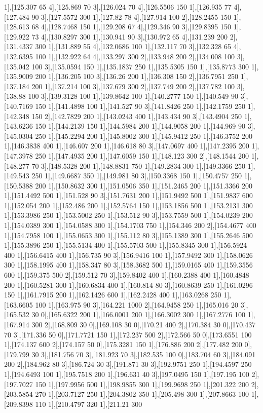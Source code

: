 {1],[125.307 65 4],[125.869 70 3],[126.024 70 4],[126.5506 150 1],[126.935 77 4],[127.484 90 3],[127.5572 300 1],[127.82 78 4],[127.914 100 2],[128.2455 150 1],[128.613 68 4],[128.7468 150 1],[129.208 67 4],[129.346 90 3],[129.8395 150 1],[129.922 73 4],[130.8297 300 1],[130.941 90 3],[130.972 65 4],[131.239 200 2],[131.4337 300 1],[131.889 55 4],[132.0686 100 1],[132.117 70 3],[132.328 65 4],[132.6395 100 1],[132.922 64 4],[133.297 300 2],[133.948 200 2],[134.008 100 3],[135.042 100 3],[135.0594 150 1],[135.1837 250 1],[135.5305 150 1],[135.8773 300 1],[135.9009 200 1],[136.205 100 3],[136.26 200 1],[136.308 150 2],[136.7951 250 1],[137.184 200 1],[137.214 100 3],[137.679 300 2],[137.749 200 2],[137.782 100 3],[138.88 100 3],[139.3128 100 1],[139.8642 100 1],[140.2777 150 1],[140.549 90 3],[140.7169 150 1],[141.4898 100 1],[141.527 90 3],[141.8426 250 1],[142.1759 250 1],[142.348 150 2],[142.7829 200 1],[143.0243 400 1],[143.434 90 3],[143.4904 250 1],[143.6236 150 1],[144.2139 150 1],[144.5984 200 1],[144.9058 200 1],[144.969 90 3],[145.0304 250 1],[145.2294 200 1],[145.8002 300 1],[145.9412 250 1],[146.3752 200 1],[146.3838 400 1],[146.607 200 1],[146.618 80 3],[147.0697 400 1],[147.2395 200 1],[147.3978 250 1],[147.4935 200 1],[147.6059 150 1],[148.123 300 2],[148.1544 200 1],[148.277 70 3],[148.5328 200 1],[148.8831 750 1],[149.2834 300 1],[149.3366 250 1],[149.543 250 1],[149.6687 350 1],[149.981 80 3],[150.3368 150 1],[150.4757 250 1],[150.5388 200 1],[150.8632 300 1],[151.0506 350 1],[151.2465 200 1],[151.3366 200 1],[151.4492 500 1],[151.528 90 3],[151.7631 200 1],[151.9492 500 1],[151.9837 600 1],[152.054 200 1],[152.486 200 1],[152.5764 150 1],[153.1856 500 1],[153.2131 300 1],[153.3986 250 1],[153.5002 250 1],[153.512 90 3],[153.7559 500 1],[154.0239 200 1],[154.0389 300 1],[154.0588 300 1],[154.1703 750 1],[154.346 200 2],[154.4677 400 1],[154.7958 100 1],[155.0653 300 1],[155.112 80 3],[155.1389 300 1],[155.2646 500 1],[155.3896 250 1],[155.5134 400 1],[155.5703 500 1],[155.8345 300 1],[156.5924 400 1],[156.6415 400 1],[156.735 90 3],[156.9416 100 1],[157.9492 300 1],[158.0626 300 1],[158.1995 400 1],[158.347 80 3],[158.3682 500 1],[159.0165 400 1],[159.3556 600 1],[159.375 500 2],[159.512 70 3],[159.8402 400 1],[160.2388 400 1],[160.4848 200 1],[160.5281 300 1],[160.6834 400 1],[160.814 80 3],[160.8639 250 1],[161.0296 150 1],[161.7915 200 1],[162.1426 600 1],[162.2428 400 1],[163.0268 250 1],[163.6605 100 1],[163.975 90 3],[164.221 1000 2],[164.9458 250 1],[165.016 20 3],[165.532 30 0],[165.6322 200 1],[166.0001 200 1],[166.3002 300 1],[167.2776 100 1],[167.914 300 2],[168.809 30 0],[169.108 30 0],[170.21 400 2],[170.384 30 0],[170.437 70 3],[171.336 50 0],[171.7721 150 1],[172.237 500 2],[172.566 50 0],[173.6551 100 1],[174.137 600 2],[174.157 50 0],[175.3281 150 1],[176.886 200 2],[177.482 200 0],[179.799 30 3],[181.756 70 3],[181.923 70 3],[182.535 100 0],[183.704 60 3],[184.091 200 2],[184.962 80 3],[186.724 30 3],[191.871 30 3],[192.9751 250 1],[194.4597 250 1],[194.6493 100 1],[195.7518 200 1],[196.631 40 3],[197.0495 150 1],[197.195 100 2],[197.7027 150 1],[197.9956 500 1],[198.9855 300 1],[199.9698 250 1],[201.322 200 2],[203.5854 270 1],[203.7127 250 1],[204.3802 350 1],[205.498 300 1],[207.8663 100 1],[209.8398 110 1],[210.4797 320 1],[211.21 300 }
